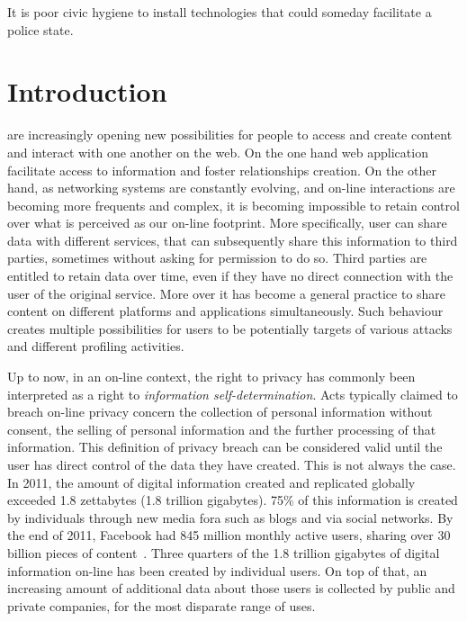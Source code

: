 \begin{savequote}[75mm] 
It is poor civic hygiene to install technologies that could someday facilitate a police state.
\end{savequote}

\chapter{Introduction}

 are increasingly opening new possibilities for people to access and create content and interact with one another on the web. On the one hand web application facilitate access to information and foster relationships creation. On the other hand, as networking systems are constantly evolving, and on-line interactions are becoming more frequents and complex, it is becoming impossible to retain control over what is perceived as our on-line footprint. More specifically, user can share data with different services, that can subsequently share this information to third parties, sometimes without asking for permission to do so. Third parties are entitled to retain data over time, even if they have no direct connection with the user of the original service. More over it has become a general practice to share content on different platforms and applications simultaneously. Such behaviour creates multiple possibilities for users to be potentially targets of various attacks and different profiling activities.

Up to now, in an on-line context, the right to privacy has commonly been interpreted as a right to \emph{information self-determination}. Acts typically claimed to breach on-line privacy concern the collection of personal information without consent, the selling of personal information and the further processing of that information. This definition of privacy breach can be considered valid until the user has direct control of the data they have created. This is not always the case. In 2011, the amount of digital information created and replicated globally exceeded 1.8 zettabytes (1.8 trillion gigabytes). 75\% of this information is created by individuals through new media fora such as blogs and via social networks. By the end of 2011, Facebook had 845 million monthly active users, sharing over 30 billion pieces of content~\cite{library-briefing}. Three quarters of the 1.8 trillion gigabytes of digital information on-line has been created by individual users. On top of that, an increasing amount of additional data about those users is collected by public and private companies, for the most disparate range of uses.

